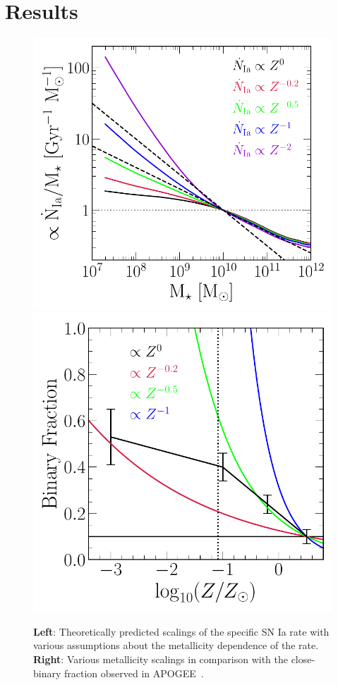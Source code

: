 \documentclass[ms.tex]{subfiles}
\begin{document}
\section{Results}
\label{sec:results}

\begin{figure}
\centering
\includegraphics[scale = 0.55]{umachine_iarate_metdep.pdf}
\includegraphics[scale = 0.55]{binaries_zscaling.pdf}
\caption{
\textbf{Left}: Theoretically predicted scalings of the specific SN Ia rate with
various assumptions about the metallicity dependence of the rate.
\textbf{Right}: Various metallicity scalings in comparison with the
close-binary fraction observed in APOGEE~\citep{Moe2019}.
}
\label{fig:specia_metdep}
\end{figure}
\end{document}
